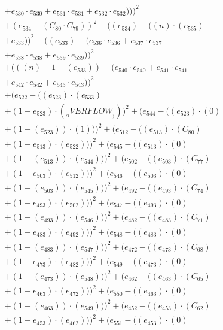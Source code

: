 \documentclass[10pt, a4paper]{article}
\begin{document}
\begin{small}
\begin{align*}
& + e_{530} \cdot e_{530} + e_{531} \cdot e_{531} + e_{532} \cdot e_{532})))^{2} \\
& + (e_{534} - (C_{80}  \cdot  C_{79}))^{2} + ((e_{534}) - ((n)  \cdot  (e_{535}) \\
& + e_{533}))^{2} + ((e_{533}) - (e_{536} \cdot e_{536} + e_{537} \cdot e_{537} \\
& + e_{538} \cdot e_{538} + e_{539} \cdot e_{539}))^{2} \\
& + (((n) - 1 - (e_{533})) - (e_{540} \cdot e_{540} + e_{541} \cdot e_{541} \\
& + e_{542} \cdot e_{542} + e_{543} \cdot e_{543}))^{2} \\
& + (e_{522} - ((e_{523})  \cdot  (e_{533}) \\
& + (1 - e_{523})  \cdot  (__OVERFLOW__)))^{2} + (e_{544} - ((e_{523}) \cdot (0) \\
& + (1 - (e_{523})) \cdot (1)))^{2} + (e_{512} - ((e_{513})  \cdot  (C_{80}) \\
& + (1 - e_{513})  \cdot  (e_{522})))^{2} + (e_{545} - ((e_{513}) \cdot (0) \\
& + (1 - (e_{513})) \cdot (e_{544})))^{2} + (e_{502} - ((e_{503})  \cdot  (C_{77}) \\
& + (1 - e_{503})  \cdot  (e_{512})))^{2} + (e_{546} - ((e_{503}) \cdot (0) \\
& + (1 - (e_{503})) \cdot (e_{545})))^{2} + (e_{492} - ((e_{493})  \cdot  (C_{74}) \\
& + (1 - e_{493})  \cdot  (e_{502})))^{2} + (e_{547} - ((e_{493}) \cdot (0) \\
& + (1 - (e_{493})) \cdot (e_{546})))^{2} + (e_{482} - ((e_{483})  \cdot  (C_{71}) \\
& + (1 - e_{483})  \cdot  (e_{492})))^{2} + (e_{548} - ((e_{483}) \cdot (0) \\
& + (1 - (e_{483})) \cdot (e_{547})))^{2} + (e_{472} - ((e_{473})  \cdot  (C_{68}) \\
& + (1 - e_{473})  \cdot  (e_{482})))^{2} + (e_{549} - ((e_{473}) \cdot (0) \\
& + (1 - (e_{473})) \cdot (e_{548})))^{2} + (e_{462} - ((e_{463})  \cdot  (C_{65}) \\
& + (1 - e_{463})  \cdot  (e_{472})))^{2} + (e_{550} - ((e_{463}) \cdot (0) \\
& + (1 - (e_{463})) \cdot (e_{549})))^{2} + (e_{452} - ((e_{453})  \cdot  (C_{62}) \\
& + (1 - e_{453})  \cdot  (e_{462})))^{2} + (e_{551} - ((e_{453}) \cdot (0) \\

\end{align*}
\end{small}
\end{document}
